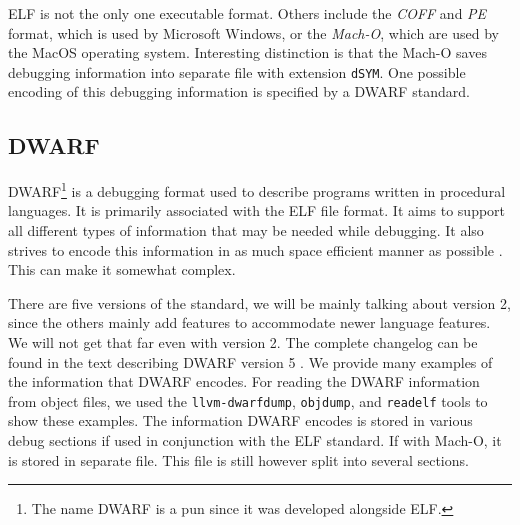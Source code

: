 ELF is not the only one executable format. Others include the \textit{COFF} and
\textit{PE} format, which is used by Microsoft Windows, or the \textit{Mach-O},
which are used by the MacOS operating system. Interesting distinction is that
the Mach-O saves debugging information into separate file with extension
\texttt{dSYM}. One possible encoding of this debugging information is specified
by a DWARF standard.

\subsection{DWARF}
DWARF\footnote{The name DWARF is a pun since it was developed alongside
ELF.}\cite{dwarf} is a debugging format used to describe programs written in
procedural languages. It is primarily associated with the ELF file format. It
aims to support all different types of information that may be needed while
debugging. It also strives to encode this information in as much space
efficient manner as possible \cite{dwarf}. This can make it somewhat complex. 

There are five versions of the standard, we will be mainly talking about
version 2, since the others mainly add features to accommodate newer language
features. We will not get that far even with version 2. The complete changelog
can be found in the text describing DWARF version 5 \cite{dwarf-5}. We provide
many examples of the information that DWARF encodes. For reading the DWARF
information from object files, we used the \texttt{llvm-dwarfdump},
\texttt{objdump}, and \texttt{readelf} tools to show these examples. The
information DWARF encodes is stored in various debug sections if used in
conjunction with the ELF standard. If with Mach-O, it is stored in separate
file. This file is still however split into several sections.

